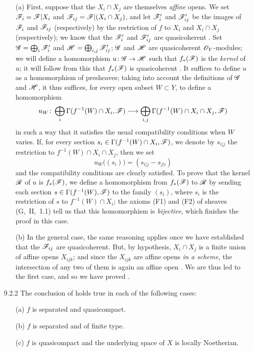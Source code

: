 \documentclass{book}
\begin{document}
\begin{itemize}
\item[(a)] First, suppose that the $X_i\cap X_j$
are themselves \emph{affine} opens.  We set $\mathscr{F}_i=\mathscr{F}|X_i$ and
$\mathscr{F}_{ij}=\mathscr{F}|(X_i\cap X_j)$, and let $\mathscr{F}'_i$ and
$\mathscr{F}'_{ij}$ be the images of $\mathscr{F}_i$ and $\mathscr{F}_{ij}$
(respectively) by the restriction of $f$ to $X_i$ and $X_i\cap X_j$
(respectively); we know that the $\mathscr{F}'_i$ and $\mathscr{F}'_{ij}$ are
quasicoherent .  Set $\mathscr{G}=\bigoplus_i\mathscr{F}'_i$ and
$\mathscr{H}=\bigoplus_{i,j}\mathscr{F}'_{ij}$; $\mathscr{G}$ and $\mathscr{H}$ are
quasicoherent $\mathscr{O}_Y$-modules; we will define a homomorphism
$u\colon\mathscr{G}\to\mathscr{H}$ such that $f_\ast(\mathscr{F})$ is the
\emph{kernel} of $u$; it will follow from this that $f_\ast(\mathscr{F})$ is
quasicoherent .  It suffices to define $u$ as a homomorphism
of presheaves; taking into account the definitions of $\mathscr{G}$ and
$\mathscr{H}$, it thus suffices, for every open subset $W\subset Y$, to define a
homomorphism
\[
   {u_W\colon\bigoplus_i\Gamma(f^{-1}(W)\cap X_i,\mathscr{F})}\longrightarrow
   {\bigoplus_{i,j}\Gamma(f^{-1}(W)\cap X_i\cap X_j,\mathscr{F})}
\]
in such a way that it satisfies the usual
compatibility conditions when $W$ varies.  If, for every section
$s_i\in\Gamma(f^{-1}(W)\cap X_i, \mathscr{F})$, we denote by $s_{i|j}$ the
restriction to $f^{-1}(W)\cap X_i\cap X_j$, then we set \[
u_W\big((s_i)\big)=(s_{i|j}-s_{j|i}) \] and the compatibility conditions are
clearly satisfied.  To prove that the kernel $\mathscr{R}$ of $u$ is
$f_\ast(\mathscr{F})$, we define a homomorphism from $f_\ast(\mathscr{F})$ to
$\mathscr{R}$ by sending each section $s\in\Gamma(f^{-1}(W),\mathscr{F})$ to the
family $(s_i)$, where $s_i$ is the restriction of $s$ to $f^{-1}(W)\cap X_i$;
the axioms (F1) and (F2) of sheaves (G,~II,~1.1) tell us that this homomorphism
is \emph{bijective}, which finishes the proof in this case.
\item[(b)] In the general case, the same reasoning applies once we have established
that the $\mathscr{F}_{ij}$ are quasicoherent.  But, by hypothesis, $X_i\cap X_j$ is a
finite union of affine opens $X_{ijk}$; and since the $X_{ijk}$ are affine opens
\emph{in a scheme}, the intersection of any two of them is again an affine open
.  We are thus led to the first case, and so we have proved .
\end{itemize}

\begin{envs}[Corollary]{9.2.2}
\label{cor-1.9.2.2}
The conclusion of  holds true in each
of the following cases:
\begin{itemize}
  \item[(a)] $f$ is separated and quasicompact.
  \item[(b)] $f$ is separated and of finite type.
  \item[(c)] $f$ is quasicompact and the underlying space of $X$ is locally Noetherian.
\end{itemize}
\end{envs}
\end{document}
